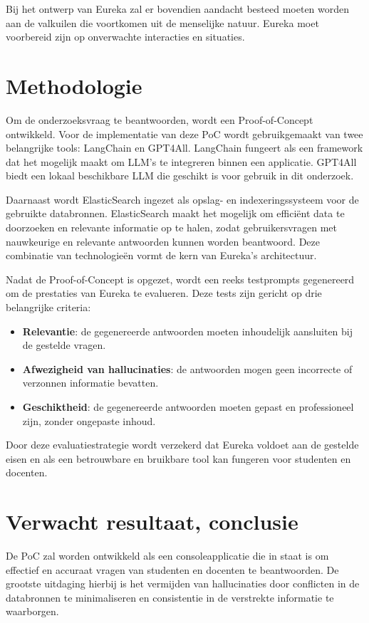 Bij het ontwerp van Eureka zal er bovendien aandacht besteed moeten worden aan de valkuilen die voortkomen uit de menselijke natuur. Eureka moet voorbereid zijn op onverwachte interacties en situaties.

\section{Methodologie}%
\label{sec:methodologie}

Om de onderzoeksvraag te beantwoorden, wordt een Proof-of-Concept ontwikkeld. Voor de implementatie van deze PoC wordt gebruikgemaakt van twee belangrijke tools: LangChain en GPT4All. LangChain fungeert als een framework dat het mogelijk maakt om LLM's te integreren binnen een applicatie. GPT4All biedt een lokaal beschikbare LLM die geschikt is voor gebruik in dit onderzoek.

Daarnaast wordt ElasticSearch ingezet als opslag- en indexeringssysteem voor de gebruikte databronnen. ElasticSearch maakt het mogelijk om efficiënt data te doorzoeken en relevante informatie op te halen, zodat gebruikersvragen met nauwkeurige en relevante antwoorden kunnen worden beantwoord. Deze combinatie van technologieën vormt de kern van Eureka’s architectuur.

Nadat de Proof-of-Concept is opgezet, wordt een reeks testprompts gegenereerd om de prestaties van Eureka te evalueren. Deze tests zijn gericht op drie belangrijke criteria:


\begin{itemize} 
    \item \textbf{Relevantie}: de gegenereerde antwoorden moeten inhoudelijk aansluiten bij de gestelde vragen.
    \item \textbf{Afwezigheid van hallucinaties}: de antwoorden mogen geen incorrecte of verzonnen informatie bevatten.
    \item \textbf{Geschiktheid}: de gegenereerde antwoorden moeten gepast en professioneel zijn, zonder ongepaste inhoud.
\end{itemize}

Door deze evaluatiestrategie wordt verzekerd dat Eureka voldoet aan de gestelde eisen en als een betrouwbare en bruikbare tool kan fungeren voor studenten en docenten.

\section{Verwacht resultaat, conclusie}%
\label{sec:verwachte_resultaten}

De PoC zal worden ontwikkeld als een consoleapplicatie die in staat is om effectief en accuraat vragen van studenten en docenten te beantwoorden. De grootste uitdaging hierbij is het vermijden van hallucinaties door conflicten in de databronnen te minimaliseren en consistentie in de verstrekte informatie te waarborgen.

